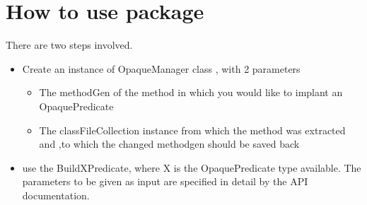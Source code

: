 \section{How to use package}
     There are two steps involved.
\begin{itemize}
  \item Create an instance of OpaqueManager class , with 2 parameters 
     \begin{itemize}
       \item The methodGen of the method in which you would like to implant an OpaquePredicate
       \item The classFileCollection instance from which the method was extracted and ,to which 
	     the changed methodgen should be saved back  
     \end{itemize}
   \item  use the BuildXPredicate, where X is the OpaquePredicate type available. The parameters
          to be given as input are specified in detail by the API documentation.
\end{itemize}

